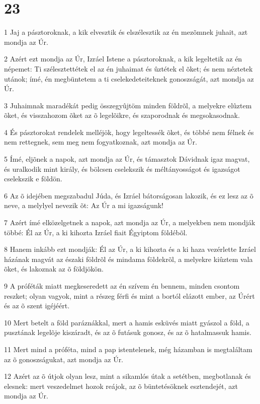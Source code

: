 \chapter{23}

\par 1 Jaj a pásztoroknak, a kik elvesztik és elszélesztik az én mezõmnek juhait, azt mondja az Úr.
\par 2 Azért ezt mondja az Úr, Izráel Istene a pásztoroknak, a kik legeltetik az én népemet: Ti szélesztettétek el az én juhaimat és ûztétek el õket; és nem néztetek utánok; ímé, én megbüntetem a ti cselekedeteiteknek gonoszságát, azt mondja az Úr.
\par 3 Juhaimnak maradékát pedig összegyûjtöm minden földrõl, a melyekre elûztem õket, és visszahozom õket az õ legelõikre, és szaporodnak és megsokasodnak.
\par 4 És pásztorokat rendelek melléjök, hogy legeltessék õket, és többé nem félnek és nem rettegnek, sem meg nem fogyatkoznak, azt mondja az Úr.
\par 5 Ímé, eljõnek a napok, azt mondja az Úr, és támasztok Dávidnak igaz magvat, és uralkodik mint király, és bölcsen cselekszik és méltányosságot és igazságot cselekszik e földön.
\par 6 Az õ idejében megszabadul Júda, és Izráel bátorságosan lakozik, és ez lesz az õ neve, a melylyel nevezik õt: Az Úr a mi igazságunk!
\par 7 Azért ímé elközelgetnek a napok, azt mondja az Úr, a melyekben nem mondják többé: Él az Úr, a ki kihozta Izráel fiait Égyiptom földébõl.
\par 8 Hanem inkább ezt mondják: Él az Úr, a ki kihozta és a ki haza vezérlette Izráel házának magvát az északi földrõl és mindama földekrõl, a melyekre kiûztem vala õket, és lakoznak az õ földjökön.
\par 9 A próféták miatt megkeseredett az én szívem én bennem, minden csontom reszket; olyan vagyok, mint a részeg férfi és mint a bortól elázott ember, az Úrért és az õ szent igéjéért.
\par 10 Mert betelt a föld paráznákkal, mert a hamis esküvés miatt gyászol a föld, a pusztának legelõje kiszáradt, és az õ futásuk gonosz, és az õ hatalmassuk hamis.
\par 11 Mert mind a próféta, mind a pap istentelenek, még házamban is megtaláltam az õ gonoszságukat, azt mondja az Úr.
\par 12 Azért az õ útjok olyan lesz, mint a sikamlós útak a setétben, megbotlanak és elesnek: mert veszedelmet hozok reájok, az õ büntetésöknek esztendejét, azt mondja az Úr.
